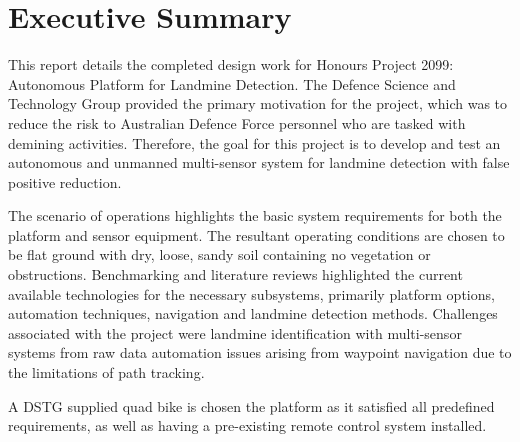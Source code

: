\documentclass[main.tex]{subfiles}
\begin{document}

{}	%
\chapter*{Executive Summary}
This report details the completed design work for Honours Project 2099: Autonomous Platform for Landmine Detection. The Defence Science and Technology Group provided the primary motivation for the project, which was to reduce the risk to Australian Defence Force personnel who are tasked with demining activities. Therefore, the goal for this project is to develop and test an autonomous and unmanned multi-sensor system for landmine detection with false positive reduction. 

The scenario of operations highlights the basic system requirements for both the platform and sensor equipment. The resultant operating conditions are chosen to be flat ground with dry, loose, sandy soil containing no vegetation or obstructions. Benchmarking and literature reviews highlighted the current available technologies for the necessary subsystems, primarily platform options, automation techniques, navigation and landmine detection methods. Challenges associated with the project were landmine identification with multi-sensor systems from raw data automation issues arising from waypoint navigation due to the limitations of path tracking.  

A DSTG supplied quad bike is chosen the platform as it satisfied all predefined requirements, as well as having a pre-existing remote control system installed.

\end{document}
